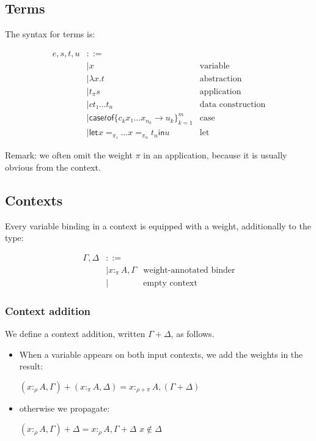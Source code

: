 \documentclass[11pt]{article}
\newcommand{\case}[2]{\mathsf{case} #1 \mathsf{of} \{#2\}^m_{k=1}}
\newcommand{\flet}[1][]{\mathsf{let}_{#1} }
\newcommand{\fin}{ \mathsf{in} }
\begin{document}
\subsection{Terms}
\label{sec:orgheadline3}

The syntax for terms is:

\begin{align*}
e,s,t,u & ::= \\
    & |  x & \text{variable} \\
    & |  λx. t & \text{abstraction} \\
    & |  t_π s & \text{application} \\
    & |  c t₁ … t_n & \text{data construction} \\
    & |  \case t {c_k  x₁ … x_{n_k} → u_k}  & \text{case} \\
    & |  \flet x =_{π₁} … x =_{π_n} t_n \fin u & \text{let}
\end{align*}

Remark: we often omit the weight $π$ in an application, because it is
usually obvious from the context.

\subsection{Contexts}
\label{sec:orgheadline6}

Every variable binding in a context is equipped with a weight,
additionally to the type:

\begin{align*}
  Γ,Δ & ::=\\
    & |  x :_π A, Γ & \text{weight-annotated binder} \\
    & |     & \text {empty context}
\end{align*}

\subsubsection{Context addition}
\label{sec:orgheadline4}

We define a context addition, written \(Γ+Δ\), as follows.

\begin{itemize}
\item When a variable appears on both input contexts, we add the weights in
the result:

\((x :_ρ A,Γ) + (x :_π A,Δ) = x :_{ρ+π} A, (Γ+Δ)\)

\item otherwise we propagate:

\((x :_ρ A,Γ) + Δ = x :_ρ A, Γ+Δ\)   \hfill   \(x ∉ Δ\)
\end{itemize}
\end{document}
